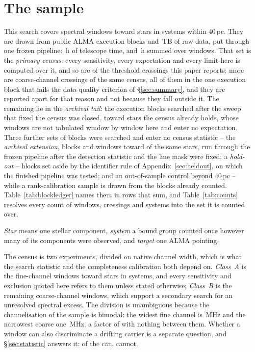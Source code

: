 \section{The sample}
\label{sec:sample}

This search covers \NWindows{} spectral windows toward \NStars{} stars in
\NSystems{} systems within 40\,pc. They are drawn from \NEB{} public ALMA
execution blocks and \TotalDataTB\,TB of raw data, put through one frozen
pipeline: \StTelHours\,h of telescope time, and \LdgCensusHours\,h summed
over windows. That set is the \emph{primary census}: every
sensitivity, every expectation and every limit here is computed over it, and
so are \MtCrossACen{} of the \EvNCrossRaw{} threshold crossings this paper
reports; \LdgNCrossB{} more are coarse-channel crossings of the same census,
all of them in the one execution block that fails the data-quality criterion
of \S\ref{sec:summary}, and they are reported apart for that reason and not
because they fall outside it. The remaining \CeNTailCross{} lie in the
\emph{archival tail}: the \LdgExtTail{} execution blocks searched after the
sweep that fixed the census was closed, toward stars the census already holds,
whose \LdgExtTailWin{} windows are not tabulated window by window here and
enter no expectation. Three further sets of blocks were searched and enter no
census statistic -- the \emph{archival extension}, \LdgExtEB{} blocks and
\LdgExtWin{} windows toward \LdgExtStars{} of the same stars, run through the
frozen pipeline after the detection statistic and the line mask were fixed; a
\emph{hold-out} -- blocks set aside by the identifier rule of
Appendix~\ref{sec:heldout}, on which the finished pipeline was tested;
and an out-of-sample control beyond 40\,pc -- while a rank-calibration sample
is drawn from the blocks already counted.
Table~\ref{tab:blockledger} names them in rows that sum, and
Table~\ref{tab:counts} resolves every count of windows, crossings and systems
into the set it is counted over.

\emph{Star} means one stellar component, \emph{system} a bound group
counted once however many of its components were observed, and \emph{target}
one ALMA pointing.

The census is two experiments, divided on native channel width, which is
what the search statistic and the completeness calibration both depend on.
\emph{Class~A} is the \NWinA{} fine-channel windows toward
\LdgClassAStars{} stars in \NSysClassA{} systems, and every sensitivity and
exclusion quoted here refers to them unless stated otherwise;
\emph{Class~B} is the remaining \NWinB{} coarse-channel windows, which
support a secondary search for an unresolved spectral excess. The division
is unambiguous because the channelisation of the sample is bimodal: the
widest fine channel is \ScChanFineMaxMHz\,MHz and the narrowest coarse one
\ScChanCoarseMinMHz\,MHz, a factor of \ScChanGapFac{} with nothing between
them. Whether a window can also discriminate a drifting carrier is a
separate question, and \S\ref{sec:statistic} answers it: \EtaDriftAOk{} of
the \NWinA{} can, \EtaDriftALo{} cannot.

